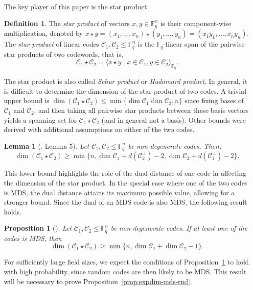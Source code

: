 \documentclass[a4paper,11pt,reqno]{article}
\newcommand{\F}{\mathbb{F}}
\newcommand{\C}{\mathcal{C}}
\theoremstyle{plain} \numberwithin{equation}{section}
\newtheorem{Lemma}[theorem]{Lemma}
\newtheorem{proposition}[theorem]{Proposition}
\theoremstyle{definition}
\newtheorem{definition}[theorem]{Definition}
\begin{document}
The key player of this paper is the star product.

\begin{definition}
   The \emph{star product} of
vectors $x,y\in \F_q^n$ is their component-wise multiplication, denoted by $x\star y = (x_1,\ldots,x_n) \star (y_1,\ldots,y_n) = (x_1y_1,\ldots,x_ny_n)$. 
The  \emph{star product}
of linear codes $\C_1,\C_2\leq \F_q^n$
is the $\F_q$-linear span of the pairwise star products of two codewords, that is, $$\C_1 \star \C_2 =\langle x\star y\mid x\in \C_1,y\in \C_2\rangle_{\F_q}.$$
\end{definition}

The star product is also called
\emph{Schur product} or \emph{Hadamard product}. 
In general, it is difficult to determine the dimension of the star product of two codes. A trivial upper bound is $\dim (\C_1\star\C_2)\leq \min\{\dim \C_1 \dim \C_2,n\}$ since fixing bases of $\C_1$ and $\C_2$, and then taking all pairwise star products between these basis vectors yields a spanning set for $\C_1 \star \C_2$ (and in general not a basis). 
Other bounds were derived with additional assumptions on either of the two codes.

\begin{Lemma}[\cite{Singletonupper}, Lemma 5] \label{lemma:singletonupper}
Let $\C_1,\C_2 \leq \F_q^n$ be non-degenerate codes. Then,
\[
    \dim (\C_1 \star \C_2) \geq \min\{n,\dim \C_1+ d(\C_2^\perp)-2, \dim \C_2 + d(\C_1^{\perp}) -2\}.
\]
\end{Lemma}

This lower bound highlights the role of the dual distance of one code in affecting the dimension of the star product. In the special case where one of the two codes is MDS, the dual distance attains its maximum possible value, allowing for a stronger bound. Since the dual of an MDS code is also MDS, the following result holds.

\begin{proposition}[\cite{randriambololona:hal-02287120}]\label{prop:MDSnondeg}
    Let $\C_1,\C_2 \leq \F_q^n$ be non-degenerate codes. If at least one of the codes is MDS, then
    \[\dim (\C_1\star\C_2) \geq \min \{ n, \dim \C_1 + \dim \C_2 -1 \}.\]
\end{proposition}

For sufficiently large field sizes, we expect the conditions of Proposition~\ref{prop:MDSnondeg} to hold with high probability, since random codes are then likely to be MDS. This result will be necessary to prove Proposition~\ref{prop:expdim-mds-rnd}.
\end{document}
